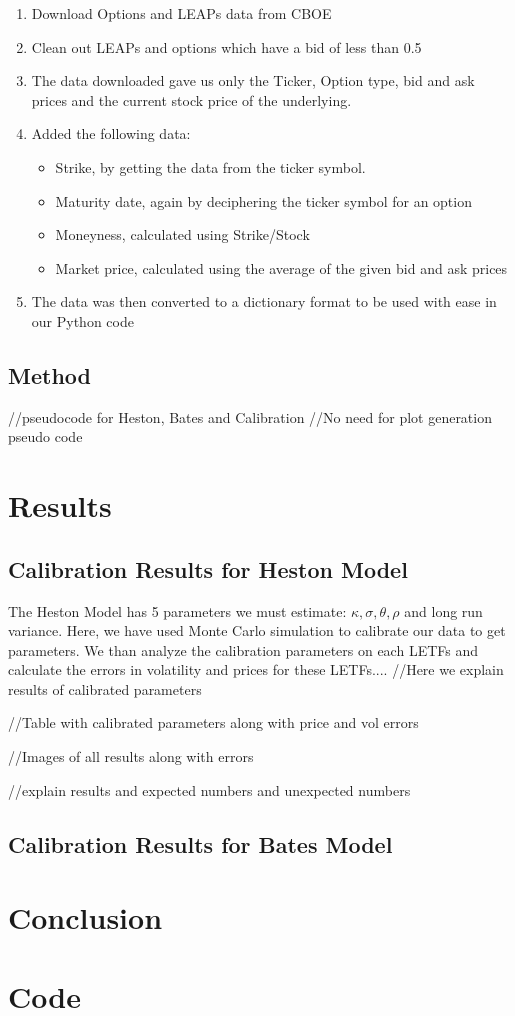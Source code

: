 \documentclass{article}
\begin{document}
\begin{enumerate}
    \item Download Options and LEAPs data from CBOE
    \item Clean out LEAPs and options which have a bid of less than 0.5
    \item The data downloaded gave us only the Ticker, Option type, bid and ask prices and the current stock price of the underlying. 
    \item Added the following data:
    \begin{itemize}
         \item Strike, by getting the data from the ticker symbol.
         \item Maturity date, again by deciphering the ticker symbol for an option
         \item Moneyness, calculated using Strike/Stock
         \item Market price, calculated using the average of the given bid and ask prices
    \end{itemize}
    \item The data was then converted to a dictionary format to be used with ease in our Python code
\end{enumerate}

\subsection{Method}

//pseudocode for Heston, Bates and Calibration
//No need for plot generation pseudo code

\section{Results}
\subsection{Calibration Results for Heston Model}
The Heston Model has 5 parameters we must estimate: $\kappa, \sigma, \theta, \rho$ and long run variance. Here, we have used Monte Carlo simulation to calibrate our data to get parameters. We than analyze the calibration parameters on each LETFs and calculate the errors in volatility and prices for these LETFs....
//Here we explain results of calibrated parameters

//Table with calibrated parameters along with price and vol errors

//Images of all results along with errors

//explain results and expected numbers and unexpected numbers

\subsection{Calibration Results for Bates Model}
\section{Conclusion}
\section{Code}




\citep{ref1}
\citep{ref2}
\citep{ref3}
\end{document}
